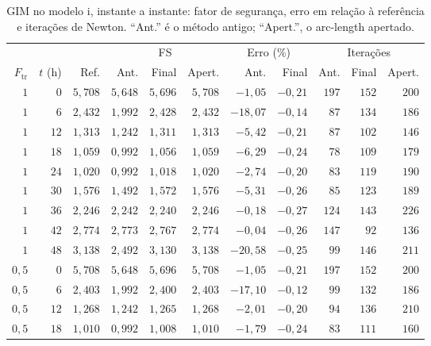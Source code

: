 \documentclass[11pt,a4paper]{article}
\numberwithin{equation}{section}
\begin{document}
\begin{table}[htbp]
\centering\footnotesize\setlength{\tabcolsep}{3pt}
\caption{GIM no modelo i, instante a instante: fator de segurança, erro em relação à referência e iterações de Newton. ``Ant.'' é o método antigo; ``Apert.'', o arc-length apertado.}\label{tab:acoplado_casos_gim}
\begin{tabular}{rrrrrrrrrrr}
\toprule
 &  &  & \multicolumn{3}{c}{FS} & \multicolumn{2}{c}{Erro (\%)} & \multicolumn{3}{c}{Iterações} \\ \cmidrule(lr){4-6}\cmidrule(lr){7-8}\cmidrule(lr){9-11} $F_{\mathrm{tr}}$ & $t$ (h) & Ref. & Ant. & Final & Apert. & Ant. & Final & Ant. & Final & Apert. \\
\midrule
$1$ & $0$ & $5{,}708$ & $5{,}648$ & $5{,}696$ & $5{,}708$ & $-1{,}05$ & $-0{,}21$ & $197$ & $152$ & $200$ \\
$1$ & $6$ & $2{,}432$ & $1{,}992$ & $2{,}428$ & $2{,}432$ & $-18{,}07$ & $-0{,}14$ & $87$ & $134$ & $186$ \\
$1$ & $12$ & $1{,}313$ & $1{,}242$ & $1{,}311$ & $1{,}313$ & $-5{,}42$ & $-0{,}21$ & $87$ & $102$ & $146$ \\
$1$ & $18$ & $1{,}059$ & $0{,}992$ & $1{,}056$ & $1{,}059$ & $-6{,}29$ & $-0{,}24$ & $78$ & $109$ & $179$ \\
$1$ & $24$ & $1{,}020$ & $0{,}992$ & $1{,}018$ & $1{,}020$ & $-2{,}74$ & $-0{,}20$ & $83$ & $119$ & $190$ \\
$1$ & $30$ & $1{,}576$ & $1{,}492$ & $1{,}572$ & $1{,}576$ & $-5{,}31$ & $-0{,}26$ & $85$ & $123$ & $189$ \\
$1$ & $36$ & $2{,}246$ & $2{,}242$ & $2{,}240$ & $2{,}246$ & $-0{,}18$ & $-0{,}27$ & $124$ & $143$ & $226$ \\
$1$ & $42$ & $2{,}774$ & $2{,}773$ & $2{,}767$ & $2{,}774$ & $-0{,}04$ & $-0{,}26$ & $147$ & $92$ & $136$ \\
$1$ & $48$ & $3{,}138$ & $2{,}492$ & $3{,}130$ & $3{,}138$ & $-20{,}58$ & $-0{,}25$ & $99$ & $146$ & $211$ \\
\midrule
$0{,}5$ & $0$ & $5{,}708$ & $5{,}648$ & $5{,}696$ & $5{,}708$ & $-1{,}05$ & $-0{,}21$ & $197$ & $152$ & $200$ \\
$0{,}5$ & $6$ & $2{,}403$ & $1{,}992$ & $2{,}400$ & $2{,}403$ & $-17{,}10$ & $-0{,}12$ & $99$ & $132$ & $186$ \\
$0{,}5$ & $12$ & $1{,}268$ & $1{,}242$ & $1{,}265$ & $1{,}268$ & $-2{,}01$ & $-0{,}20$ & $94$ & $136$ & $210$ \\
$0{,}5$ & $18$ & $1{,}010$ & $0{,}992$ & $1{,}008$ & $1{,}010$ & $-1{,}79$ & $-0{,}24$ & $83$ & $111$ & $160$ \\

\end{tabular}
\end{table}
\end{document}
